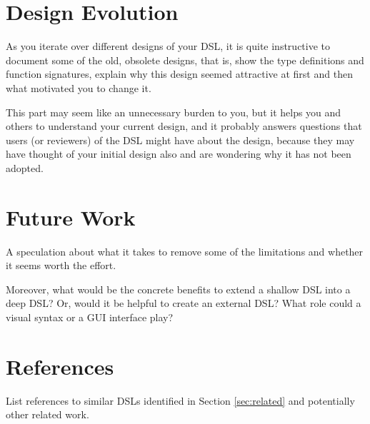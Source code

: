 \documentclass[11pt]{article}
\begin{document}
\bigskip\noindent{}



\section{Design Evolution}
\label{sec:evol}

As you iterate over different designs of your DSL, it is quite instructive to
document some of the old, obsolete designs, that is, show the type definitions
and function signatures, explain why this design seemed attractive at first
and then what motivated you to change it.

This part may seem like an unnecessary burden to you, but it helps you and
others to understand your current design, and it probably answers questions
that users (or reviewers) of the DSL might have about the design, because they
may have thought of your initial design also and are wondering why it has not
been adopted.



\section{Future Work}
\label{sec:future}

A speculation about what it takes to remove some of the limitations and
whether it seems worth the effort.

Moreover, what would be the concrete benefits to extend a shallow DSL into a
deep DSL? Or, would it be helpful to create an external DSL? What role could a
visual syntax or a GUI interface play?



\section*{References}

List references to similar DSLs identified in Section \ref{sec:related} and
potentially other related work.
\end{document}
